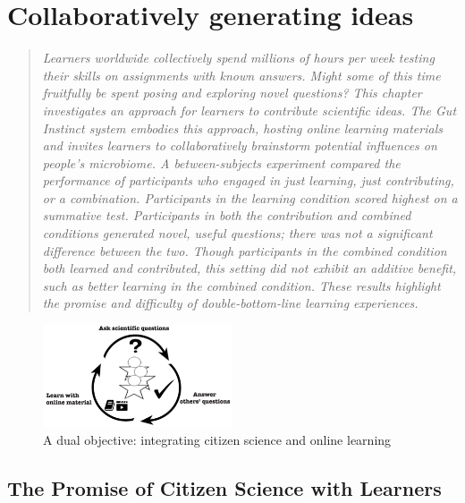 \chapter{Collaboratively generating ideas}

\begin{quote}
\emph{Learners worldwide collectively spend millions of hours per week testing their skills on assignments with known answers. Might some of this time fruitfully be spent posing and exploring novel questions? This chapter investigates an approach for learners to contribute scientific ideas. The Gut Instinct system embodies this approach, hosting online learning materials and invites learners to collaboratively brainstorm potential influences on people’s microbiome. A between-subjects experiment compared the performance of participants who engaged in just learning, just contributing, or a combination. Participants in the learning condition scored highest on a summative test. Participants in both the contribution and combined conditions generated novel, useful questions; there was not a significant difference between the two. Though participants in the combined condition both learned and contributed, this setting did not exhibit an additive benefit, such as better learning in the combined condition. These results highlight the promise and difficulty of double-bottom-line learning experiences.}
\end{quote}

\begin{figure}[h]
  \centering
  \includegraphics[width=0.5\textwidth]{figures/gutinstinct/gi-1.png}
  \caption[A dual objective: integrating citizen science and online learning]
{A dual objective: integrating citizen science and online learning}
  \label{fig:gi-1}
\end{figure}

\vspace{0.25in}


\section{The Promise of Citizen Science with Learners}

